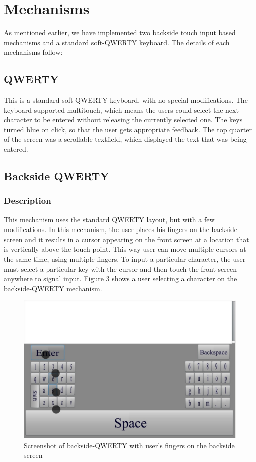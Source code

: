 \section{Mechanisms}

As mentioned earlier, we have implemented two backside touch input based
mechanisms and a standard soft-QWERTY keyboard. The details of each mechanisms 
follow:

\subsection{QWERTY}

This is a standard soft QWERTY keyboard, with no special
modifications. The keyboard supported multitouch, which means the
users could select the next character to be entered without releasing
the currently selected one. The keys turned blue on click, so that the
user gets appropriate feedback. The top quarter of the screen was a
scrollable textfield, which displayed the text that was being entered.

\subsection{Backside QWERTY}
\subsubsection{Description}

This mechanism uses the standard QWERTY layout, but with a few
modifications. In this mechanism, the user places his fingers on the
backside screen and it results in a cursor appearing on the front
screen at a location that is vertically above the touch point. This
way user can move multiple cursors at the same time, using multiple
fingers. To input a particular character, the user must select a
particular key with the cursor and then touch the front screen
anywhere to signal input. Figure 3 shows a user selecting a
character on the backside-QWERTY mechanism.

\begin{figure}
    \includegraphics[scale=0.45]{Figures/backside.pdf} 
    \caption{Screenshot of backside-QWERTY with user's fingers on the
      backside screen}
\end{figure}

